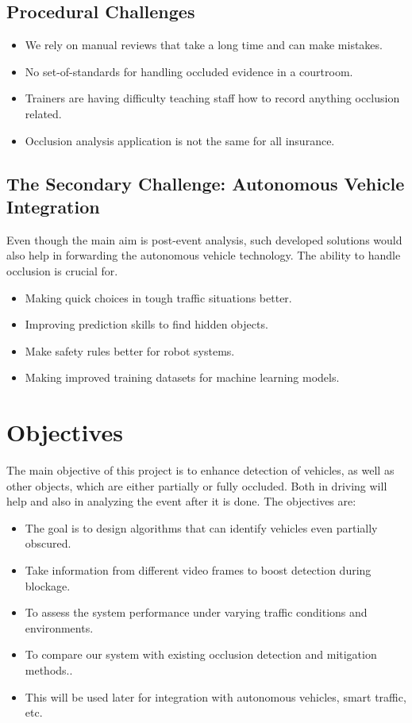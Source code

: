 \documentclass[12pt,a4paper]{report}
\theoremstyle{definition}
\theoremstyle{remark}
\begin{document}
\subsection{Procedural Challenges}
\begin{itemize}
    \item We rely on manual reviews that take a long time and can make mistakes.
    \item No set-of-standards for handling occluded evidence in a courtroom.
    \item Trainers are having difficulty teaching staff how to record anything occlusion related.
    \item Occlusion analysis application is not the same for all insurance.
\end{itemize}

\subsection{The Secondary Challenge: Autonomous Vehicle Integration}
Even though the main aim is post-event analysis, such developed solutions would also help in forwarding the autonomous vehicle technology. The ability to handle occlusion is crucial for.
\begin{itemize}
    \item Making quick choices in tough traffic situations better.
    \item Improving prediction skills to find hidden objects.
    \item Make safety rules better for robot systems.
    \item Making improved training datasets for machine learning models.
\end{itemize}

\section{Objectives}
The main objective of this project is to enhance detection of vehicles, as well as other objects, which are either partially or fully occluded. Both in driving will help and also in analyzing the event after it is done. The objectives are:
\begin{itemize}
    \item The goal is to design algorithms that can identify vehicles even partially obscured.
    \item Take information from different video frames to boost detection during blockage.
    \item To assess the system performance under varying traffic conditions and environments.
    \item To compare our system with existing occlusion detection and mitigation methods..
    \item This will be used later for integration with autonomous vehicles, smart traffic, etc.
\end{itemize}
\end{document}
